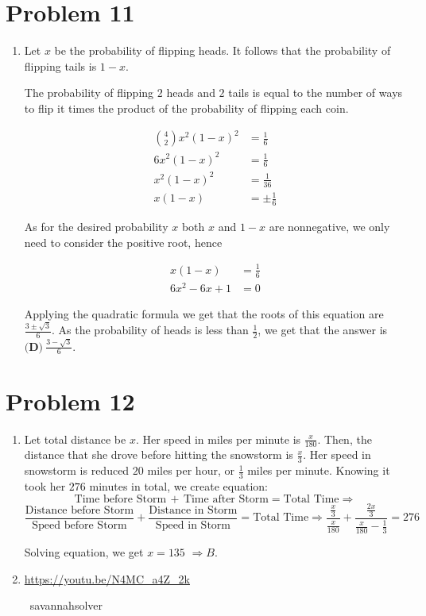 \documentclass{article}%
\begin{document}
%
\section*{Problem 11}%
\label{sec:Problem11}%
\begin{enumerate}%
\item%
Let $x$ be the probability of flipping heads. It follows that the probability of flipping tails is $1-x$.

The probability of flipping $2$ heads and $2$ tails is equal to the number of ways to flip it times the product of the probability of flipping each coin.

\begin{align*}{4 \choose 2}x^2(1-x)^2 &= \frac{1}{6}\\ 6x^2(1-x)^2 &= \frac{1}{6}\\ x^2(1-x)^2 &= \frac{1}{36}\\ x(1-x) &= \pm\frac{1}{6}\end{align*}

As for the desired probability $x$ both $x$ and $1-x$ are nonnegative, we only need to consider the positive root, hence

\begin{align*}x(1-x) &= \frac{1}{6}\\ 6x^2-6x+1&=0\end{align*}

Applying the quadratic formula we get that the roots of this equation are $\frac{3\pm\sqrt{3}}{6}$. As the probability of heads is less than $\frac{1}{2}$, we get that the answer is $\boxed{\textbf{(D)}\ \frac{3-\sqrt{3}}{6}}$.

%
\end{enumerate}

%
\section*{Problem 12}%
\label{sec:Problem12}%
\begin{enumerate}%
\item%
Let total distance be $x$. Her speed in miles per minute is $\frac{x}{180}$. Then, the distance that she drove before hitting the snowstorm is $\frac{x}{3}$. Her speed in snowstorm is reduced $20$ miles per hour, or $\frac{1}{3}$ miles per minute. Knowing it took her $276$ minutes in total, we create equation: 
\[\text{Time before Storm}\, + \, \text{Time after Storm} = \text{Total Time} \Longrightarrow\]
\[\frac{\text{Distance before Storm}}{\text{Speed before Storm}} + \frac{\text{Distance in Storm}}{\text{Speed in Storm}} = \text{Total Time} \Longrightarrow \frac{\frac{x}{3}}{\frac{x}{180}} + \frac{\frac{2x}{3}}{\frac{x}{180} - \frac{1}{3}} = 276\]

Solving equation, we get $x=135$ $\Longrightarrow \boxed{B}$.

%
\item%
\href{https://youtu.be/N4MC_a4Z_2k}{https://youtu.be/N4MC\_a4Z\_2k}

~savannahsolver

%
\end{enumerate}
\end{document}
